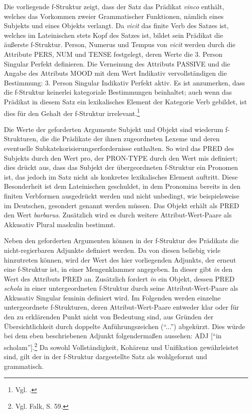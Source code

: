 \documentclass[12pt,a4paper]{article}
\begin{document}
Die vorliegende f-Struktur zeigt, dass der Satz das Prädikat \textit{vinco} enthält, welches das Vorkommen zweier Grammatischer Funktionen, nämlich eines Subjekts und eines Objekts verlangt. Da \textit{vicit} das finite Verb des Satzes ist, welches im Lateinischen stets Kopf des Satzes ist, bildet sein Prädikat die äußerste f-Struktur. Person, Numerus und Tempus von \textit{vicit} werden durch die Attribute  PERS, NUM und TENSE festgelegt, deren Werte die 3. Person Singular Perfekt definieren. Die Verneinung des Attributs PASSIVE und die Angabe des Attributs MOOD mit dem Wert Indikativ vervollständigen die Bestimmung: 3. Person Singular Indikativ Perfekt aktiv. Es ist anzumerken, dass die f-Struktur keinerlei kategoriale Bestimmungen beinhaltet; auch wenn das Prädikat in diesem Satz ein lexikalisches Element der Kategorie Verb gebildet, ist dies für den Gehalt der f-Struktur irrelevant.\footnote{Vgl. \cite[7]{Skript}.}

Die Werte der geforderten Argumente Subjekt und Objekt sind wiederum f-Strukturen, die die Prädikate der ihnen zugeordneten Lexeme und deren eventuelle Subkatekorisierungserfordernisse enthalten. So wird das PRED des Subjekts durch den Wert pro, der PRON-TYPE durch den Wert mis definiert; dies drückt aus, dass das Subjekt der übergeordneten f-Struktur ein Pronomen ist, das jedoch im Satz nicht als konkretes lexikalisches Element auftritt. Diese Besonderheit ist dem Lateinischen geschuldet, in dem Pronomina bereits in den finiten Verbformen ausgedrückt werden und nicht unbedingt, wie beispielsweise im Deutschen, gesondert genannt werden müssen. Das Objekt erhält als PRED den Wert \textit{barbarus}. Zusätzlich wird es durch weitere Attribut-Wert-Paare als Akkusativ Plural maskulin bestimmt. 

Neben den geforderten Argumenten können in der f-Struktur des Prädikats die nicht-regierbaren Adjunkte definiert werden. Da von diesen beliebig viele hinzutreten können, wird der Wert des hier vorliegenden Adjunkts, der erneut eine f-Struktur ist, in einer Mengenklammer angegeben. In dieser gibt \textit{in} den Wert des Attributs PRED an. Zusätzlich fordert \textit{in} ein Objekt, dessen PRED \textit{schola} in einer untergeordneten f-Struktur durch seine Attribut-Wert-Paare als Akkusativ Singular feminin definiert wird. Im Folgenden werden einzelne untergeordnete f-Strukturen, deren Attribut-Wert-Paare entweder klar oder für den zu erklärenden Punkt nicht von Bedeutung sind, aus Gründen der Übersichtlichkeit durch doppelte Anführungszeichen (``...'') abgekürzt. Dies würde bei dem eben beschriebenen Adjunkt folgendermaßen aussehen: ADJ [“in scholam”].\footnote{Vgl. Falk, S. 59.}
Da sowohl Vollständigkeit, Kohärenz und Unifikation gewährleistet sind, gilt der in der f-Struktur dargestellte Satz als wohlgeformt und grammatisch.
\end{document}
